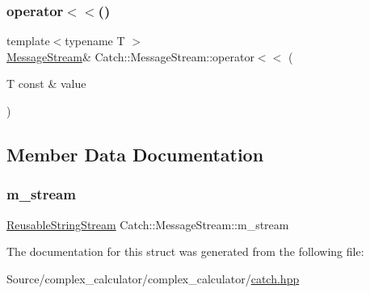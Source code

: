\subsubsection{\texorpdfstring{operator$<$$<$()}{operator<<()}}
{\footnotesize\ttfamily template$<$typename T $>$ \\
\mbox{\hyperlink{struct_catch_1_1_message_stream}{Message\+Stream}}\& Catch\+::\+Message\+Stream\+::operator$<$$<$ (\begin{DoxyParamCaption}\item[{T const \&}]{value }\end{DoxyParamCaption})\hspace{0.3cm}{\ttfamily [inline]}}



\subsection{Member Data Documentation}
\mbox{\label{struct_catch_1_1_message_stream_a9202520faed8882ef469db9f353ec578}} 
\subsubsection{\texorpdfstring{m\+\_\+stream}{m\_stream}}
{\footnotesize\ttfamily \mbox{\hyperlink{class_catch_1_1_reusable_string_stream}{Reusable\+String\+Stream}} Catch\+::\+Message\+Stream\+::m\+\_\+stream}



The documentation for this struct was generated from the following file\+:\begin{DoxyCompactItemize}
\item 
Source/complex\+\_\+calculator/complex\+\_\+calculator/\mbox{\hyperlink{catch_8hpp}{catch.\+hpp}}\end{DoxyCompactItemize}
